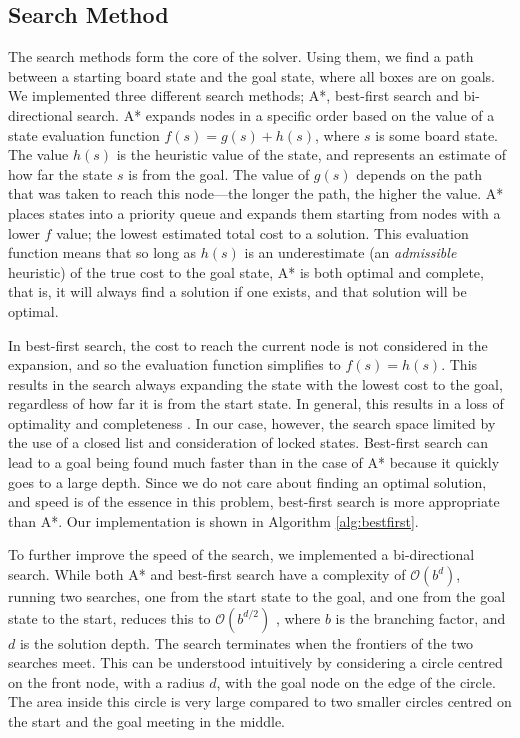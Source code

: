 \documentclass[a4paper,11pt]{article}
\begin{document}
\subsection{Search Method}

The search methods form the core of the solver. Using them, we find a path
between a starting board state and the goal state, where all boxes are on
goals. We implemented three different search methods; A*, best-first search and
bi-directional search. A* expands nodes in a specific order based on the value
of a state evaluation function $f(s)=g(s)+h(s)$, where $s$ is some board
state. The value $h(s)$ is the heuristic value of the state, and represents an
estimate of how far the state $s$ is from the goal. The value of $g(s)$ depends
on the path that was taken to reach this node---the longer the path, the higher
the value. A* places states into a priority queue and expands them starting from
nodes with a lower $f$ value; the lowest estimated total cost to a
solution. This evaluation function means that so long as $h(s)$ is an
underestimate (an \emph{admissible} heuristic) of the true cost to the goal
state, A* is both optimal and complete, that is, it will always find a solution
if one exists, and that solution will be optimal\cite{aima}.

In best-first search, the cost to reach the current node is not considered in
the expansion, and so the evaluation function simplifies to $f(s)=h(s)$. This
results in the search always expanding the state with the lowest cost to the
goal, regardless of how far it is from the start state. In general, this results
in a loss of optimality and completeness \cite{aima}. In our case, however, the
search space limited by the use of a closed list and consideration of locked
states. Best-first search can lead to a goal being found much faster than in the
case of A* because it quickly goes to a large depth. Since we do not care about
finding an optimal solution, and speed is of the essence in this problem,
best-first search is more appropriate than A*. Our implementation is shown in
Algorithm \ref{alg:bestfirst}.

To further improve the speed of the search, we implemented a bi-directional
search. While both A* and best-first search have a complexity of
$\mathcal{O}(b^d)$, running two searches, one from the start state to the goal,
and one from the goal state to the start, reduces this to $\mathcal{O}(b^{d/2})$
\cite{aima}, where $b$ is the branching factor, and $d$ is the solution
depth. The search terminates when the frontiers of the two searches meet. This
can be understood intuitively by considering a circle centred on the front node,
with a radius $d$, with the goal node on the edge of the circle. The area inside
this circle is very large compared to two smaller circles centred on the start
and the goal meeting in the middle.
\end{document}
